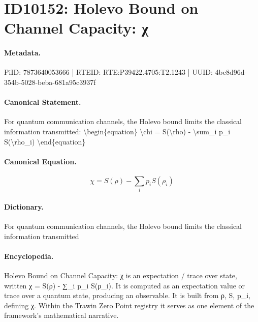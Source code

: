 \section*{ID10152: Holevo Bound on Channel Capacity: χ}
\paragraph{Metadata.}
PiID: 7873640053666 | RTEID: RTE:P39422.4705:T2.1243 | UUID: 4bc8d96d-354b-5028-beba-681a95c3937f

\paragraph{Canonical Statement.}
For quantum communication channels, the Holevo bound limits the classical information transmitted: \textbackslash{}begin\{equation\} \textbackslash{}chi = S(\textbackslash{}rho) - \textbackslash{}sum\_i p\_i S(\textbackslash{}rho\_i) \textbackslash{}end\{equation\}

\paragraph{Canonical Equation.}
\[
\chi = S(\rho) - \sum_i p_i S(\rho_i)
\]

\paragraph{Dictionary.}
For quantum communication channels, the Holevo bound limits the classical information transmitted

\paragraph{Encyclopedia.}
Holevo Bound on Channel Capacity: χ is an expectation / trace over state, written χ = S(ρ) - ∑\_i p\_i S(ρ\_i). It is computed as an expectation value or trace over a quantum state, producing an observable. It is built from ρ, S, p\_i, defining χ. Within the Trawin Zero Point registry it serves as one element of the framework's mathematical narrative.
